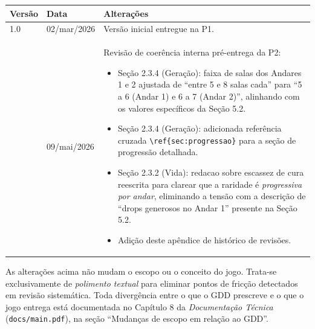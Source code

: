 \documentclass[12pt, a4paper]{article}
\begin{document}
\begin{table}[H]
  \centering
  \small
  \begin{tabularx}{\textwidth}{l l X}
    \toprule
    \textbf{Vers\~ao} & \textbf{Data} & \textbf{Altera\c{c}\~oes} \\
    \midrule
    1.0 & 02/mar/2026 & Vers\~ao inicial entregue na P1. \\
    \addlinespace
    1.1 & 09/mai/2026 & Revis\~ao de coer\^encia interna pr\'e-entrega da P2:
      \begin{itemize}\setlength{\itemsep}{0pt}
        \item Se\c{c}\~ao 2.3.4 (Gera\c{c}\~ao): faixa de salas dos Andares 1 e 2
          ajustada de ``entre 5 e 8 salas cada'' para ``5 a 6 (Andar 1) e 6 a 7
          (Andar 2)'', alinhando com os valores espec\'ificos da Se\c{c}\~ao 5.2.
        \item Se\c{c}\~ao 2.3.4 (Gera\c{c}\~ao): adicionada refer\^encia cruzada
          \texttt{\textbackslash ref\{sec:progressao\}} para a se\c{c}\~ao de
          progress\~ao detalhada.
        \item Se\c{c}\~ao 2.3.2 (Vida): redacao sobre escassez de cura
          reescrita para clarear que a raridade \'e \emph{progressiva por andar},
          eliminando a tens\~ao com a descri\c{c}\~ao de ``drops generosos no
          Andar 1'' presente na Se\c{c}\~ao 5.2.
        \item Adi\c{c}\~ao deste ap\^endice de hist\'orico de revis\~oes.
      \end{itemize} \\
    \bottomrule
  \end{tabularx}
\end{table}

As altera\c{c}\~oes acima n\~ao mudam o escopo ou o conceito do jogo. Trata-se exclusivamente de \emph{polimento textual} para eliminar pontos de fric\c{c}\~ao detectados em revis\~ao sistem\'atica. Toda diverg\^encia entre o que o GDD prescreve e o que o jogo entrega est\'a documentada no Cap\'itulo 8 da \emph{Documenta\c{c}\~ao T\'ecnica} (\texttt{docs/main.pdf}), na se\c{c}\~ao ``Mudan\c{c}as de escopo em rela\c{c}\~ao ao GDD''.
\end{document}
